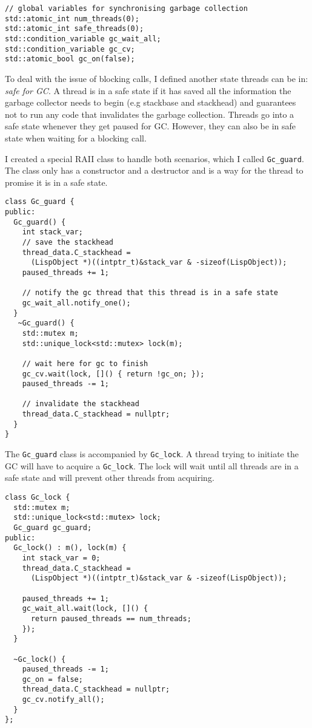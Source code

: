 \begin{verbatim}
// global variables for synchronising garbage collection
std::atomic_int num_threads(0);
std::atomic_int safe_threads(0);
std::condition_variable gc_wait_all;
std::condition_variable gc_cv;
std::atomic_bool gc_on(false);
\end{verbatim}

To deal with the issue of blocking calls, I defined another state threads can be in: \emph{safe for GC}. A thread
is in a safe state if it has saved all the information the garbage collector needs to begin (e.g stackbase
and stackhead) and guarantees not to run any code that invalidates the garbage collection. Threads go into a safe
state whenever they get paused for GC. However, they can also be in safe state when waiting for a blocking call.

I created a special RAII class to handle both scenarios, which I called \texttt{Gc\_guard}. The class only has a constructor
and a destructor and is a way for the thread to promise it is in a safe state.

\begin{verbatim}
class Gc_guard {
public:
  Gc_guard() {
    int stack_var;
    // save the stackhead
    thread_data.C_stackhead =
      (LispObject *)((intptr_t)&stack_var & -sizeof(LispObject));
    paused_threads += 1;

    // notify the gc thread that this thread is in a safe state
    gc_wait_all.notify_one();
  }
   ~Gc_guard() {
    std::mutex m;
    std::unique_lock<std::mutex> lock(m);

    // wait here for gc to finish
    gc_cv.wait(lock, []() { return !gc_on; });
    paused_threads -= 1;

    // invalidate the stackhead
    thread_data.C_stackhead = nullptr;
  }
}
\end{verbatim}

The \texttt{Gc\_guard} class is accompanied by \texttt{Gc\_lock}. A thread trying to initiate the GC will have to
acquire a \texttt{Gc\_lock}. The lock will wait until all threads are in a safe state and will prevent
other threads from acquiring.

\begin{verbatim}
class Gc_lock {
  std::mutex m;
  std::unique_lock<std::mutex> lock;
  Gc_guard gc_guard;
public:
  Gc_lock() : m(), lock(m) {
    int stack_var = 0;
    thread_data.C_stackhead =
      (LispObject *)((intptr_t)&stack_var & -sizeof(LispObject));

    paused_threads += 1;
    gc_wait_all.wait(lock, []() {
      return paused_threads == num_threads;
    });
  }

  ~Gc_lock() {
    paused_threads -= 1;
    gc_on = false;
    thread_data.C_stackhead = nullptr;
    gc_cv.notify_all();
  }
};
\end{verbatim}

